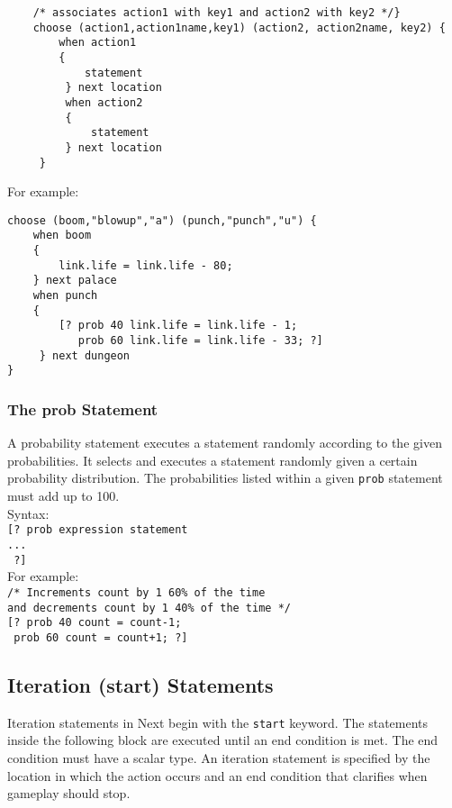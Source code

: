 \documentclass[12pt]{article}
\begin{document}
\begin{verbatim}
    /* associates action1 with key1 and action2 with key2 */}
    choose (action1,action1name,key1) (action2, action2name, key2) {
        when action1 
        {
            statement
         } next location
         when action2 
         {
             statement
         } next location
     }
\end{verbatim}

\noindent For example: 
\begin{verbatim}
choose (boom,"blowup","a") (punch,"punch","u") {
    when boom 
    {
        link.life = link.life - 80;
    } next palace
    when punch 
    {
        [? prob 40 link.life = link.life - 1;
           prob 60 link.life = link.life - 33; ?]
     } next dungeon
}
\end{verbatim}

\subsubsection{The prob Statement}
A probability statement executes a statement randomly according to the given probabilities.  It selects and executes a statement randomly given a certain probability distribution.  The probabilities listed within a given \texttt{prob} statement must add up to 100. \\

\noindent Syntax: \\

\texttt{[? prob expression statement \\
\indent \indent \indent \texttt{... } \\
\indent \texttt{ ?]}} \\

\noindent For example: \\

\texttt{/* Increments count by 1 60\% of the time} \\
\indent \indent \texttt{and decrements count by 1 40\% of the time */} \\
\indent \texttt{[? prob 40 count = count-1;} \\
\indent \indent \texttt{   prob 60 count = count+1; ?]}

\subsection{Iteration (start) Statements}

Iteration statements in Next begin with the \texttt{start} keyword.  The statements inside the following block are executed until an end condition is met.  The end condition must have a scalar type.  An iteration statement is specified by the location in which the action occurs and an end condition that clarifies when gameplay should stop. \\
\end{document}
